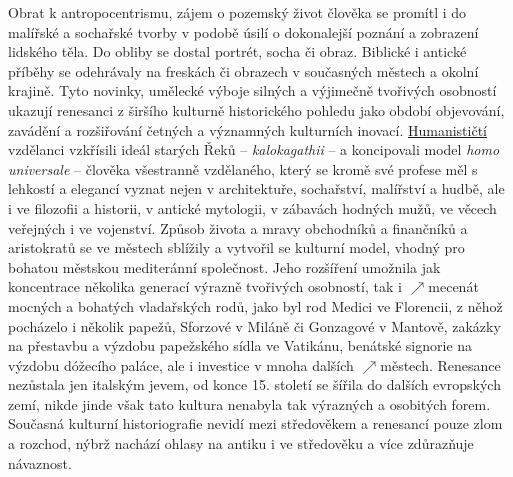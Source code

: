 \documentclass{article}
\begin{document}
  Obrat k antropocentrismu, zájem o pozemský život člověka se promítl i do malířské a sochařské tvorby v podobě úsilí o dokonalejší poznání a zobrazení lidského těla. Do obliby se dostal portrét, socha či obraz. Biblické i antické příběhy se odehrávaly na freskách či obrazech v současných městech a okolní krajině. Tyto novinky, umělecké výboje silných a výjimečně tvořivých osobností ukazují renesanci z širšího kulturně historického pohledu jako období objevování, zavádění a rozšiřování četných a významných kulturních inovací. \hyperref[sec:humanismus]{Humanističtí} vzdělanci vzkřísili ideál starých Řeků -- {\it kalokagathii} -- a koncipovali model {\it homo universale} -- člověka všestranně vzdělaného, který se kromě své profese měl s lehkostí a elegancí vyznat nejen v architektuře, sochařství, malířství a hudbě, ale i ve filozofii a historii, v antické mytologii, v zábavách hodných mužů, ve věcech veřejných i ve vojenství. Způsob života a mravy obchodníků a finančníků a aristokratů se ve městech sblížily a vytvořil se kulturní model, vhodný pro bohatou městskou mediteránní společnost. Jeho rozšíření umožnila jak koncentrace několika generací výrazně tvořivých osobností, tak i $\nearrow$mecenát mocných a bohatých vladařských rodů, jako byl rod Medici ve Florencii, z něhož pocházelo i několik papežů, Sforzové v Miláně či Gonzagové v Mantově, zakázky na přestavbu a výzdobu papežského sídla ve Vatikánu, benátské signorie na výzdobu dóžecího paláce, ale i investice v mnoha dalších $\nearrow$městech. Renesance nezůstala jen italským jevem, od konce 15. století se šířila do dalších evropských zemí, nikde jinde však tato kultura nenabyla tak výrazných a osobitých forem. Současná kulturní historiografie nevidí mezi středověkem a renesancí pouze zlom a rozchod, nýbrž nachází ohlasy na antiku i ve středověku a více zdůrazňuje návaznost.
\end{document}
